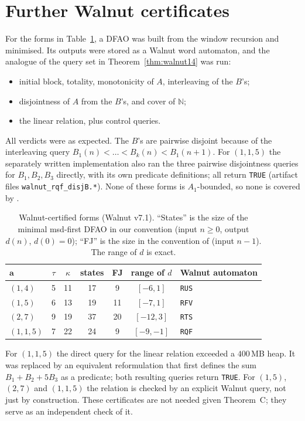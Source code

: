 \documentclass[11pt]{amsart}
\theoremstyle{definition}
\theoremstyle{remark}
\newcommand{\N}{\mathbb{N}}
\begin{document}
\section{Further Walnut certificates}\label{sec:walnut}
For the forms in Table~\ref{tab:walnut}, a DFAO was built from the window recursion and minimised. Its outputs were stored as a Walnut word automaton, and the analogue of the query set in Theorem~\ref{thm:walnut14} was run:
\begin{itemize}
\item initial block, totality, monotonicity of $A$, interleaving of the $B$'s;
\item disjointness of $A$ from the $B$'s, and cover of $\N$;
\item the linear relation, plus control queries.
\end{itemize}
All verdicts were as expected. The $B$'s are pairwise disjoint because of the interleaving query $B_1(n)<\dots<B_k(n)<B_1(n+1)$. For $(1,1,5)$ the separately written implementation also ran the three pairwise disjointness queries for $B_1,B_2,B_3$ directly, with its own predicate definitions; all return \texttt{TRUE} (artifact files \texttt{walnut\_rqf\_disjB.*}). None of these forms is $A_1$-bounded, so none is covered by \cite{FJarxiv,FJ}.

\begin{table}[ht]
\centering
\caption{Walnut-certified forms (Walnut v7.1). ``States'' is the size of the minimal msd-first DFAO in our convention (input $n\ge0$, output $d(n)$, $d(0)=0$); ``FJ'' is the size in the convention of \cite{FJ} (input $n-1$). The range of $d$ is exact.}\label{tab:walnut}
\begin{tabular}{l c c c c c l}
\toprule
$\mathbf a$ & $\tau$ & $\kappa$ & states & FJ & range of $d$ & Walnut automaton \\
\midrule
$(1,4)$ & 5 & 11 & 17 & 9 & $[-6,1]$ & \texttt{RUS}\\
$(1,5)$ & 6 & 13 & 19 & 11 & $[-7,1]$ & \texttt{RFV}\\
$(2,7)$ & 9 & 19 & 37 & 20 & $[-12,3]$ & \texttt{RTS}\\
$(1,1,5)$ & 7 & 22 & 24 & 9 & $[-9,-1]$ & \texttt{RQF}\\
\bottomrule
\end{tabular}
\end{table}

For $(1,1,5)$ the direct query for the linear relation exceeded a $400$\,MB heap. It was replaced by an equivalent reformulation that first defines the sum $B_1+B_2+5B_3$ as a predicate; both resulting queries return \texttt{TRUE}. For $(1,5)$, $(2,7)$ and $(1,1,5)$ the relation is checked by an explicit Walnut query, not just by construction. These certificates are not needed given Theorem~C; they serve as an independent check of it.
\end{document}
